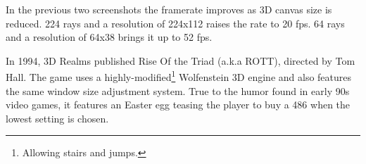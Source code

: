    \begin{figure}[H]
\centering
 \end{figure}
 \par
 In the previous two screenshots the framerate improves as 3D canvas size is reduced. 224 rays and a resolution of 224x112 raises the rate to 20 fps. 64 rays and a resolution of 64x38 brings it up to 52 fps.\\
 \par
{} In 1994, 3D Realms published Rise Of the Triad (a.k.a ROTT), directed by Tom Hall. The game uses a highly-modified\footnote{Allowing stairs and jumps.} Wolfenstein 3D engine and also features the same window size adjustment system. True to the humor found in early 90s video games, it features an Easter egg teasing the player to buy a 486 when the lowest setting is chosen.
    \begin{figure}[H]
\centering
 \end{figure}
 \par
